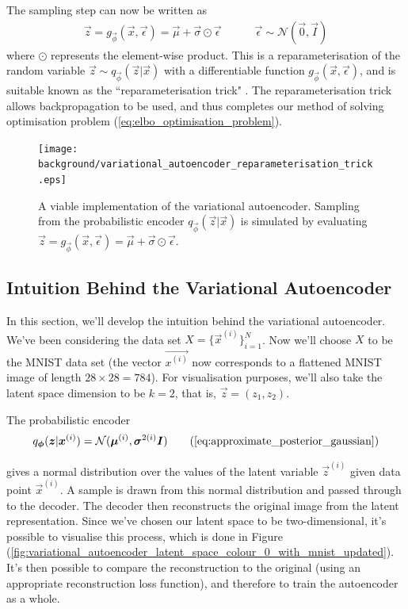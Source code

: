 The sampling step can now be written as
\begin{align}
\vec{z} = g_{\vec{\phi}}(\vec{x}, \vec{\epsilon}) = \vec{\mu} + \vec{\sigma} \odot \vec{\epsilon} \quad\quad\quad \vec{\epsilon} \sim \mathcal{N}(\vec{0}, \vec{I})
\end{align}
where $\odot$ represents the element-wise product. This is a reparameterisation of the random variable $\vec{z}\sim q_{\vec{\phi}}(\vec{z}|\vec{x})$ with a differentiable function $g_{\vec{\phi}}(\vec{x}, \vec{\epsilon})$, and is suitable known as the ``reparameterisation trick" \cite{Kingma2014}. The reparameterisation trick allows backpropagation to be used, and thus completes our method of solving optimisation problem (\ref{eq:elbo_optimisation_problem}).\\

\begin{figure}[h!]
\centering
\captionsetup{justification=centering}
\texttt{[image: background/variational\_autoencoder\_reparameterisation\_trick.eps]}
\caption{A viable implementation of the variational autoencoder. Sampling from the probabilistic encoder $q_{\vec{\phi}}(\vec{z} | \vec{x})$ is simulated by evaluating $\vec{z} = g_{\vec{\phi}}(\vec{x}, \vec{\epsilon}) = \vec{\mu} + \vec{\sigma} \odot \vec{\epsilon}$.}
\label{fig:variational_autoencoder_reparameterisation_trick}
\end{figure}

\newpage
\subsection{Intuition Behind the Variational Autoencoder}
In this section, we'll develop the intuition behind the variational autoencoder. We've been considering the data set $X = \{ \vec{x}^{(i)} \}_{i=1}^{N}$. Now we'll choose $X$ to be the MNIST data set (the vector $\vec{x^{(i)}}$ now corresponds to a flattened MNIST image of length $28\times 28 = 784$). For visualisation purposes, we'll also take the latent space dimension to be $k = 2$, that is, $\vec{z} = (z_1, z_2)$.

The probabilistic encoder
\begin{align}
q_{\vec{\phi}}(\vec{z} | \vec{x}^{(i)}) = \mathcal{N}(\vec{\mu}^{(i)}, \vec{\sigma}^{2(i)}\vec{I})
\tag{\ref{eq:approximate_posterior_gaussian}}
\end{align}

gives a normal distribution over the values of the latent variable $\vec{z}^{(i)}$ given data point $\vec{x}^{(i)}$. A sample is drawn from this normal distribution and passed through to the decoder. The decoder then reconstructs the original image from the latent representation. Since we've chosen our latent space to be two-dimensional, it's possible to visualise this process, which is done in Figure (\ref{fig:variational_autoencoder_latent_space_colour_0_with_mnist_updated}). It's then possible to compare the reconstruction to the original (using an appropriate reconstruction loss function), and therefore to train the autoencoder as a whole.

